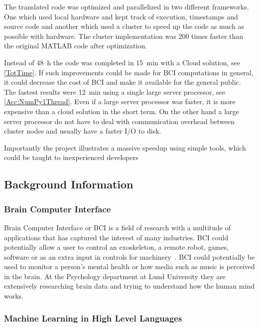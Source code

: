 \documentclass[12pt, a4paper]{article}
\begin{document}
The translated code was optimized and parallelized in two different frameworks.
One which used local hardware and kept track of execution, timestamps and source code and another which used a cluster to speed up the code as much as possible with hardware.
The cluster implementation was 200 times faster than the original MATLAB code after optimization.

Instead of \SI{48}{\hour} the code was completed in \SI{15}{\minute} with a Cloud solution, see \cref{TotTime}.
If such improvements could be made for BCI computations in general, it could decrease the cost of BCI and make it available for the general public.
The fastest results were \SI{12}{\minute} using a single large server processor, see \cref{Acc:NumPy1Thread}.
Even if a large server processor was faster, it is more expensive than a cloud solution in the short term.
On the other hand a large server processor do not have to deal with communication overhead between cluster nodes and usually have a faster I/O to disk.

Importantly the project illustrates a massive speedup using simple tools, which could be taught to inexperienced developers


\subsection{Background Information}

\subsubsection{Brain Computer Interface}

Brain Computer Interface or BCI is a field of research with a multitude of applications that has captured the interest of many industries.
BCI could potentially allow a user to control an exoskeleton, a remote robot, games, software or as an extra input in controls for machinery~\cite{10.3389/fnins.2010.00198}.
BCI could potentially be used to monitor a person's mental health or how media such as music is perceived in the brain.
At the Psychology department at Lund University they are extensively researching brain data and trying to understand how the human mind works.

\subsubsection{Machine Learning in High Level Languages}
\end{document}
